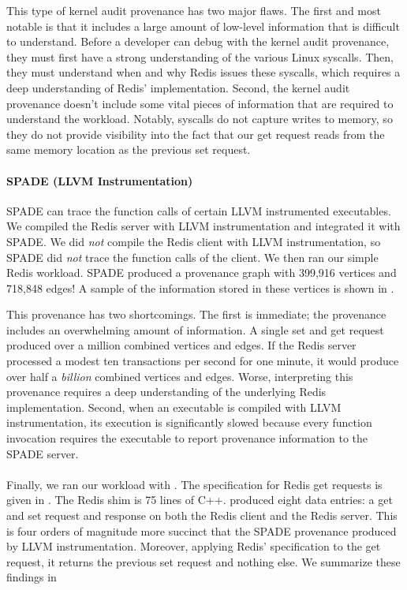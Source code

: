 This type of kernel audit provenance has two major flaws. The first and most
notable is that it includes a large amount of low-level information that is
difficult to understand. Before a developer can debug with the kernel audit
provenance, they must first have a strong understanding of the various Linux
syscalls. Then, they must understand when and why Redis issues these syscalls,
which requires a deep understanding of Redis' implementation. Second, the
kernel audit provenance doesn't include some vital pieces of information that
are required to understand the workload. Notably, syscalls do not capture
writes to memory, so they do not provide visibility into the fact that our get
request reads from the same memory location as the previous set request.

\paragraph{SPADE (LLVM Instrumentation)}
SPADE can trace the function calls of certain LLVM instrumented executables. We
compiled the Redis server with LLVM instrumentation and integrated it with
SPADE. We did \emph{not} compile the Redis client with LLVM instrumentation, so
SPADE did \emph{not} trace the function calls of the client. We then ran our
simple Redis workload. SPADE produced a provenance graph with 399,916 vertices
and 718,848 edges! A sample of the information stored in these vertices is
shown in .

This provenance has two shortcomings. The first is immediate; the provenance
includes an overwhelming amount of information. A single set and get request
produced over a million combined vertices and edges. If the Redis server
processed a modest ten transactions per second for one minute, it would produce
over half a \emph{billion} combined vertices and edges. Worse, interpreting
this provenance requires a deep understanding of the underlying Redis
implementation. Second, when an executable is compiled with LLVM
instrumentation, its execution is significantly slowed because every function
invocation requires the executable to report provenance information to the
SPADE server.

\paragraph{\fluent{}}
Finally, we ran our workload with \fluent{}. The \fluent{} \watprovenance{}
specification for Redis get requests is given in
. The Redis shim is 75 lines of C++.  \fluent{}
produced eight data entries: a get and set request and response on both the
Redis client and the Redis server. This is four orders of magnitude more
succinct that the SPADE provenance produced by LLVM instrumentation. Moreover,
applying Redis' \watprovenance{} specification to the get request, it returns
the previous set request and nothing else. We summarize these findings in

